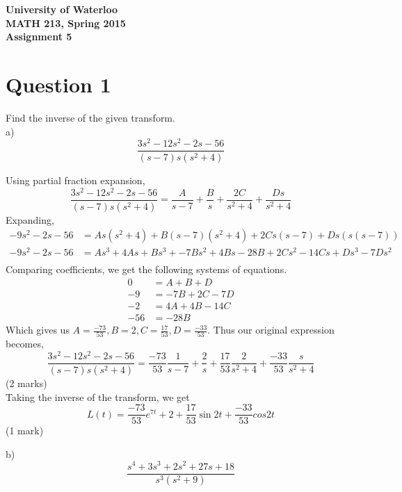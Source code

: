 \documentclass[12pt]{article}
\begin{document}
\begin{center}
{\Large\bf University of Waterloo}\\
\vspace{3mm}
{\Large\bf MATH 213, Spring 2015}\\
\vspace{2mm}
{\Large\bf Assignment 5}\\
\end{center}

\section*{Question 1}

Find the inverse of the given transform. \\

\noindent
a) $$\frac{3s^2 - 12s^2 - 2s - 56}{(s-7)s(s^2+4)}$$

Using partial fraction expansion, $$\frac{3s^2 - 12s^2 - 2s - 56}{(s-7)s(s^2+4)} = \frac{A}{s-7} + \frac{B}{s} + \frac{2C}{s^2+4} + \frac{Ds}{s^2+4}$$
\indent Expanding,
\begin{align*}
  -9s^2 - 2s - 56 &= As(s^2+4) + B(s-7)(s^2+4) + 2Cs(s-7) + Ds(s(s-7))\\
  -9s^2 - 2s - 56 &= As^3 + 4As + Bs^3 + -7Bs^2 + 4Bs - 28B + 2Cs^2 -14Cs + Ds^3 - 7Ds^2 \\
\end{align*}
\indent Comparing coefficients, we get the following systems of equations.
\begin{align*}
  0 &= A + B + D\\
  -9 &= -7B + 2C - 7D \\
  -2 &= 4A + 4B -14C \\
  -56 &= -28B
\end{align*}
\indent Which gives us $A = \frac{-73}{53}, B = 2, C = \frac{17}{53}, D = \frac{-33}{53}$. Thus our original expression becomes,
$$\frac{3s^2 - 12s^2 - 2s - 56}{(s-7)s(s^2+4)} = \frac{-73}{53}\frac{1}{s-7} + \frac{2}{s} + \frac{17}{53}\frac{2}{s^2+4} + \frac{-33}{53}\frac{s}{s^2+4}$$\hfill (2 marks) \\
\indent Taking the inverse of the transform, we get $$L(t) = \frac{-73}{53}e^{7t} + 2 + \frac{17}{53}\sin2t + \frac{-33}{53}cos2t$$ \hfill (1 mark)

b) $$\frac{s^4 + 3s^3 + 2s^2 + 27s + 18}{s^3(s^2+9)}$$
\end{document}
